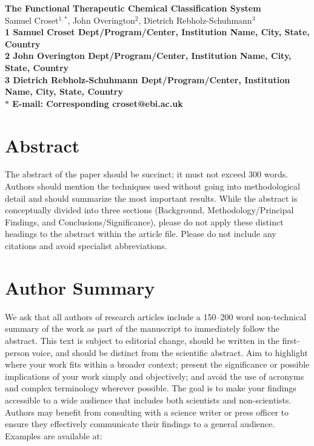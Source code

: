 \documentclass[10pt]{article}
\date{}
\begin{document}
\begin{flushleft}
{\Large
\textbf{The Functional Therapeutic Chemical Classification System}
}
\\
Samuel Croset$^{1,\ast}$, 
John Overington$^{2}$, 
Dietrich Rebholz-Schuhmann$^{3}$
\\
\bf{1} Samuel Croset Dept/Program/Center, Institution Name, City, State, Country
\\
\bf{2} John Overington Dept/Program/Center, Institution Name, City, State, Country
\\
\bf{3} Dietrich Rebholz-Schuhmann Dept/Program/Center, Institution Name, City, State, Country
\\
$\ast$ E-mail: Corresponding croset@ebi.ac.uk
\end{flushleft}

\section*{Abstract}

The abstract of the paper should be succinct; it must not exceed 300 words. 
Authors should mention the techniques used without going into methodological detail 
and should summarize the most important results. While the abstract is conceptually divided into 
three sections (Background, Methodology/Principal Findings, and Conclusions/Significance), please 
do not apply these distinct headings to the abstract within the article file. Please do 
not include any citations and avoid specialist abbreviations.


\section*{Author Summary}

We ask that all authors of research articles include a 150–200 word non-technical summary 
of the work as part of the manuscript to immediately follow the abstract. This text is subject to editorial 
change, should be written in the first-person voice, and should be distinct from the scientific abstract. Aim to 
highlight where your work fits within a broader context; present the significance or possible implications of your work 
simply and objectively; and avoid the use of acronyms and complex terminology wherever possible. The goal is to make your 
findings accessible to a wide audience that includes both scientists and non-scientists. Authors may benefit from consulting 
with a science writer or press officer to ensure they effectively communicate their findings to a general audience. Examples 
are available at:
\end{document}

